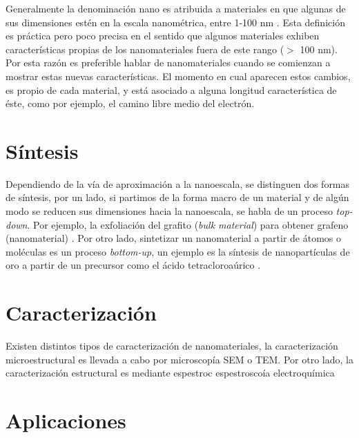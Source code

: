 
Generalmente la denominación nano es atribuida a materiales en que algunas de sus dimensiones estén en la escala nanométrica, entre 1-100 nm \citep{Gressler2013}. Esta definición es práctica pero poco precisa en el sentido que algunos materiales exhiben características propias de los nanomateriales fuera de este rango ($>$ 100 nm). Por esta razón es preferible hablar de nanomateriales cuando se comienzan a mostrar estas nuevas características. El momento en cual aparecen estos cambios, es propio de cada material, y está asociado a alguna longitud característica de éste, como por ejemplo, el camino libre medio del electrón.

\section{Síntesis}
Dependiendo de la vía de aproximación a la nanoescala, se distinguen dos formas de síntesis, por un lado, si partimos de la forma macro de un material y de algún modo se reducen sus dimensiones hacia la nanoescala, se habla de un proceso \textit{top-down}. Por ejemplo, la exfoliación del grafito (\textit{bulk material}) para obtener grafeno (nanomaterial) \citep{Novoselov2004}.  Por otro lado, sintetizar un nanomaterial a partir de átomos o moléculas es un proceso \textit{bottom-up}, un ejemplo es la síntesis de nanopartículas de oro a partir de un precursor como el ácido tetracloroaúrico \citep{Daniel2004}.

\section{Caracterización}
Existen distintos tipos de caracterización de nanomateriales, la caracterización microestructural es llevada a cabo por microscopía SEM o TEM. Por otro lado, la caracterización estructural es mediante espestroc
espestroscoía
electroquímica


\section{Aplicaciones}


